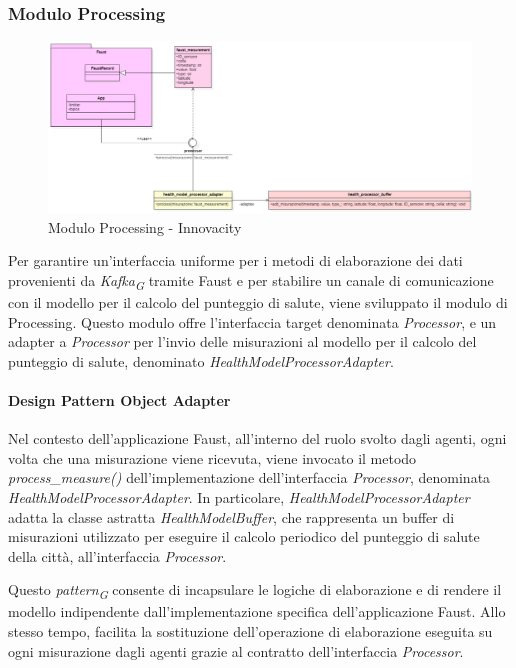 \subsubsection{Modulo Processing}
\begin{figure}[H]
    \centering
    \includegraphics[width=1\textwidth]{../Images/SpecificaTecnica/processorFaust.PNG}
    \caption{Modulo Processing - Innovacity}
    \label{fig: processHealth}
\end{figure}
Per garantire un'interfaccia uniforme per i metodi di elaborazione dei dati provenienti da \textit{Kafka}\textsubscript{\textit{G}} tramite Faust e per stabilire un canale di comunicazione con il modello per il calcolo del punteggio di salute, viene sviluppato il modulo di Processing. Questo modulo offre l'interfaccia target denominata \textit{Processor}, e un adapter a \textit{Processor} per l'invio delle misurazioni al modello per il calcolo del punteggio di salute, denominato \textit{HealthModelProcessorAdapter}.

\paragraph*{Design Pattern Object Adapter}
Nel contesto dell'applicazione Faust, all'interno del ruolo svolto dagli agenti, ogni volta che una misurazione viene ricevuta, viene invocato il metodo \textit{process\_measure()} dell'implementazione dell'interfaccia \textit{Processor}, denominata \textit{HealthModelProcessorAdapter}. In particolare, \textit{HealthModelProcessorAdapter} adatta la classe astratta \textit{HealthModelBuffer}, che rappresenta un buffer di misurazioni utilizzato per eseguire il calcolo periodico del punteggio di salute della città, all'interfaccia \textit{Processor}.

Questo \textit{pattern}\textsubscript{\textit{G}} consente di incapsulare le logiche di elaborazione e di rendere il modello indipendente dall'implementazione specifica dell'applicazione Faust. Allo stesso tempo, facilita la sostituzione dell'operazione di elaborazione eseguita su ogni misurazione dagli agenti grazie al contratto dell'interfaccia \textit{Processor}.

